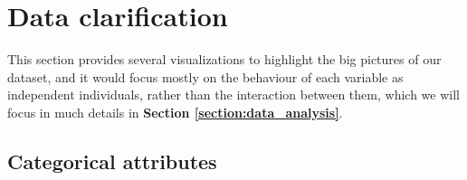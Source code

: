 %
%   
\clearpage
\section{Data clarification}
\label{section:data_clarify}

This section provides several visualizations to highlight the big pictures of our dataset, and it would
focus mostly on the behaviour of each variable as independent individuals, rather than the interaction 
between them, which we will focus in much details in \textbf{Section \ref{section:data_analysis}}.

\subsection{Categorical attributes}

